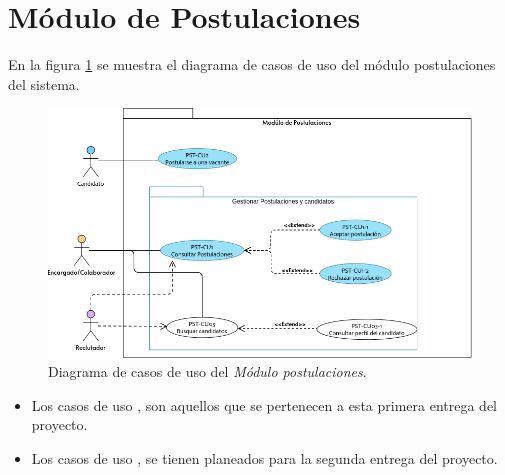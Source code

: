 	
	

	
	

	
	
	


	\section{Módulo de Postulaciones}
	En la figura \ref{adcu:usr} se muestra el diagrama de casos de uso del módulo postulaciones del sistema.

	\begin{figure}[hbtp!]
		\begin{center}
			\includegraphics[width=.8\textwidth]{sprints/imagenes/DCUPST.png}
		\end{center}
		
		\caption{Diagrama de casos de uso del \textit{Módulo postulaciones}.}
		\label{adcu:usr}
	\end{figure}

	\begin{itemize}
        \item Los casos de uso \IUazul{} , son aquellos que se pertenecen a esta primera entrega del proyecto.
        \item Los casos de uso \IUblanco{}, se tienen planeados para la segunda entrega del proyecto.
    \end{itemize} 

	
	

	
	